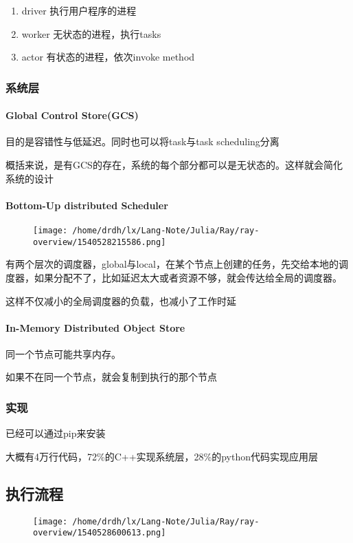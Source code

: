 \documentclass[]{article}
\let\oldparagraph\paragraph
\renewcommand{\paragraph}[1]{\oldparagraph{#1}\mbox{}}
\begin{document}
\begin{enumerate}
\def\labelenumi{\arabic{enumi}.}
\item
  driver 执行用户程序的进程
\item
  worker 无状态的进程，执行tasks
\item
  actor 有状态的进程，依次invoke method
\end{enumerate}

\subsubsection{系统层}\label{header-n156}

\paragraph{Global Control Store(GCS)}\label{header-n157}

目的是容错性与低延迟。同时也可以将task与task scheduling分离

概括来说，是有GCS的存在，系统的每个部分都可以是无状态的。这样就会简化系统的设计

\paragraph{Bottom-Up distributed Scheduler}\label{header-n160}

\begin{figure}
\centering
\texttt{[image: /home/drdh/lx/Lang-Note/Julia/Ray/ray-overview/1540528215586.png]}
\caption{}
\end{figure}

有两个层次的调度器，global与local，在某个节点上创建的任务，先交给本地的调度器，如果分配不了，比如延迟太大或者资源不够，就会传达给全局的调度器。

这样不仅减小的全局调度器的负载，也减小了工作时延

\paragraph{In-Memory Distributed Object Store}\label{header-n164}

同一个节点可能共享内存。

如果不在同一个节点，就会复制到执行的那个节点

\subsubsection{实现}\label{header-n167}

已经可以通过pip来安装

大概有4万行代码，72\%的C++实现系统层，28\%的python代码实现应用层

\subsection{执行流程}\label{header-n170}

\begin{figure}
\centering
\texttt{[image: /home/drdh/lx/Lang-Note/Julia/Ray/ray-overview/1540528600613.png]}
\caption{}
\end{figure}
\end{document}
